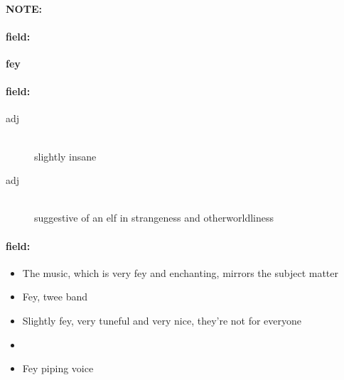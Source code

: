 \documentclass[12pt]{article}
\newenvironment{note}{\paragraph{NOTE:}}{}
\newenvironment{field}{\paragraph{field:}}{}
\begin{document}
\begin{note}
\begin{field}
\textbf{\large fey}
\end{field}


\begin{field}
\begin{description}
\item[adj] \hfill \\ 
slightly insane

\item[adj] \hfill \\ 
suggestive of an elf in strangeness and otherworldliness

\end{description}
\end{field}

\begin{field}
\begin{itemize}
\item The music, which is very fey and enchanting, mirrors the subject matter
\item Fey, twee band
\item Slightly fey, very tuneful and very nice, they're not for everyone
\item 
\item Fey piping voice
\end{itemize}
\end{field}
\end{note}
\end{document}
